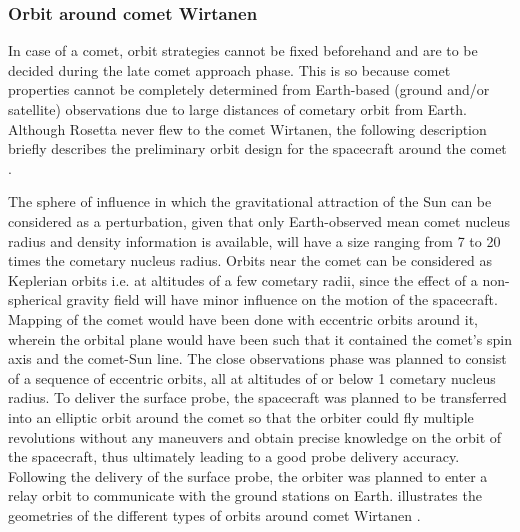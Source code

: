 \subsubsection{Orbit around comet Wirtanen}
In case of a comet, orbit strategies cannot be fixed beforehand and are to be decided during the late comet approach phase. This is so because comet properties cannot be completely determined from Earth-based (ground and/or satellite) observations due to large distances of cometary orbit from Earth. Although Rosetta never flew to the comet Wirtanen, the following description briefly describes the preliminary orbit design for the spacecraft around the comet \cite{rosettaoldmartin}.

The sphere of influence in which the gravitational attraction of the Sun can be considered as a perturbation, given that only Earth-observed mean comet nucleus radius and density information is available, will have a size ranging from 7 to 20 times the cometary nucleus radius. Orbits near the comet can be considered as Keplerian orbits i.e. at altitudes of a few cometary radii, since the effect of a non-spherical gravity field will have minor influence on the motion of the spacecraft. Mapping of the comet would have been done with eccentric orbits around it, wherein the orbital plane would have been such that it contained the comet's spin axis and the comet-Sun line. The close observations phase was planned to consist of a sequence of eccentric orbits, all at altitudes of or below 1 cometary nucleus radius. To deliver the surface probe, the spacecraft was planned to be transferred into an elliptic orbit around the comet so that the orbiter could fly multiple revolutions without any maneuvers and obtain precise knowledge on the orbit of the spacecraft, thus ultimately leading to a good probe delivery accuracy. Following the delivery of the surface probe, the orbiter was planned to enter a relay orbit to communicate with the ground stations on Earth.  illustrates the geometries of the different types of orbits around comet Wirtanen \cite{rosettaoldmartin}.

